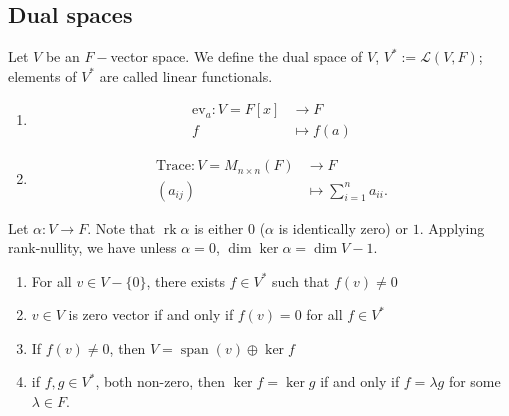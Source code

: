 \documentclass{scrartcl}
\def\L{\mathcal{L}}
\DeclareMathOperator{\rank}{rk}
\DeclareMathOperator{\spn}{span}  %
\begin{document}
\subsection{Dual spaces}
\begin{definition}
	Let $V$ be an $F-$vector space. We define the dual space of $V$, $V^* := \L(V, F)$; elements of $V^*$ are called linear functionals.
\end{definition}
\begin{example}
	\begin{enumerate}
		\item \begin{align*}
			\text{ev}_a: V = F[x] &\to F \\
			f &\mapsto f(a)
		\end{align*}
		\item \begin{align*}
			\text{Trace}: V = M_{n \times n}(F) &\to F \\
			(a_{ij}) &\mapsto \sum_{i=1}^n a_{ii}.
		\end{align*}
	\end{enumerate}
\end{example}
\begin{remark}
	Let $\alpha: V \to F$. Note that $\rank{\alpha}$ is either $0$ ($\alpha$ is identically zero) or $1$. Applying rank-nullity, we have unless $\alpha=0$, $\dim \ker \alpha = \dim{V}-1$.
\end{remark}
\begin{proposition} \label{dualstuff}
	\begin{enumerate}
		\item For all $v \in V-\{0\}$, there exists $f \in V^*$ such that $f(v) \ne 0$
		\item $v \in V$ is zero vector if and only if $f(v)=0$ for all $f \in V^*$
		\item If $f(v) \ne 0$, then $V = \spn(v) \oplus \ker{f}$
		\item if $f, g \in V^*$, both non-zero, then $\ker{f} = \ker {g}$ if and only if $f = \lambda g$ for some $\lambda \in F$.
	\end{enumerate}
\end{proposition}
\end{document}
